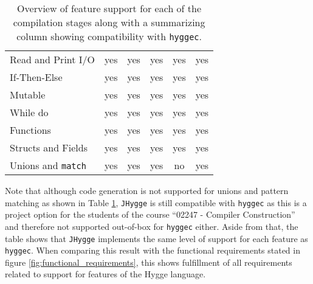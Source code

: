 \begin{table}[H]
\begin{tabular}{lccccc}
Read and Print I/O           & yes                                & yes                              & yes                                & yes                                & yes                                                              \\
If-Then-Else                 & yes                                & yes                              & yes                                & yes                                & yes                                                              \\
Mutable                      & yes                                & yes                              & yes                                & yes                                & yes                                                              \\
While do                     & yes                                & yes                              & yes                                & yes                                & yes                                                              \\
Functions                    & yes                                & yes                              & yes                                & yes                                & yes                                                              \\  
Structs and Fields & yes                                & yes                              & yes                                & yes           & yes                                         \\ 
Unions and \texttt{match}  & yes                                & yes                              & yes                                & no                                 & yes                                                             
\end{tabular}
\caption{Overview of feature support for each of the compilation stages along with a summarizing column showing compatibility with \texttt{hyggec}.}
\label{table:requirements_fulfillment}
\end{table}

Note that although code generation is not supported for unions and pattern matching as shown in Table \ref{table:requirements_fulfillment}, \texttt{JHygge} is still compatible with \texttt{hyggec}
as this is a project option for the students of the course ``02247 - Compiler Construction'' and therefore not supported out-of-box for \texttt{hyggec}
either. Aside from that, the table shows that \texttt{JHygge} implements the same level of support for each feature as \texttt{hyggec}.
When comparing this result with the functional requirements stated in figure \ref{fig:functional_requirements}, this shows fulfillment of all requirements related to support for features of the Hygge language.


